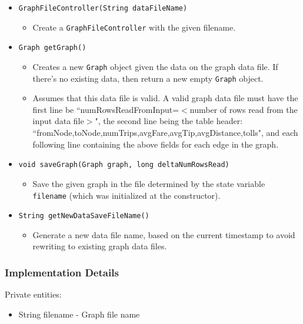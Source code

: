 \documentclass[12pt]{article}
\newcommand{\bi}{\begin{itemize}}
\newcommand{\ei}{\end{itemize}}
\newcommand{\code}[1]{\texttt{#1}}
\begin{document}
\bi
   	\item \code{GraphFileController(String dataFileName)}
	\bi
		\item Create a \code{GraphFileController} with the given filename.
	\ei
   	\item \code{Graph getGraph()}
	\bi
		\item Creates a new \code{Graph} object given the data on the graph data file. If there's no existing data, then return a new empty \code{Graph} object. 
		\item Assumes that this data file is valid. A valid graph data file must have the first line be ``numRowsReadFromInput=$<$number of rows read from the input data file$>$", the second line being the table header: \\``fromNode,toNode,numTrips,avgFare,avgTip,avgDistance,tolls", and each following line containing the above fields for each edge in the graph. 
	\ei
   	\item \code{void saveGraph(Graph graph, long deltaNumRowsRead)}
	\bi
		\item Save the given graph in the file determined by the state variable \code{filename} (which was initialized at the constructor). 
	\ei
   	\item \code{String getNewDataSaveFileName()}
	\bi
		\item Generate a new data file name, based on the current timestamp to avoid rewriting to existing graph data files. 
	\ei
\ei

\subsubsection{Implementation Details}

Private entities:
\bi
    \item String filename - Graph file name
\ei
\end{document}
